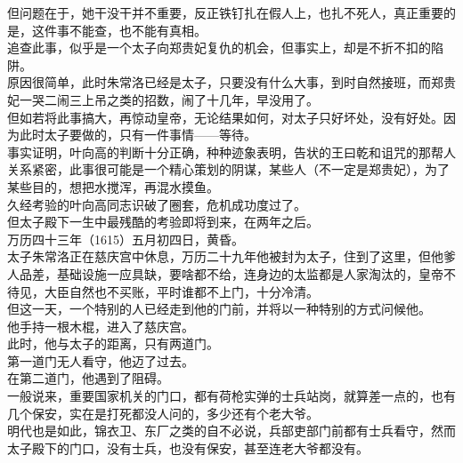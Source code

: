 \begin{multicols}{\theparacolNo}
但问题在于，她干没干并不重要，反正铁钉扎在假人上，也扎不死人，真正重要的是，这件事不能查，也不能有真相。\\

追查此事，似乎是一个太子向郑贵妃复仇的机会，但事实上，却是不折不扣的陷阱。\\

原因很简单，此时朱常洛已经是太子，只要没有什么大事，到时自然接班，而郑贵妃一哭二闹三上吊之类的招数，闹了十几年，早没用了。\\

但如若将此事搞大，再惊动皇帝，无论结果如何，对太子只好坏处，没有好处。因为此时太子要做的，只有一件事情——等待。\\

事实证明，叶向高的判断十分正确，种种迹象表明，告状的王曰乾和诅咒的那帮人关系紧密，此事很可能是一个精心策划的阴谋，某些人（不一定是郑贵妃），为了某些目的，想把水搅浑，再混水摸鱼。\\

久经考验的叶向高同志识破了圈套，危机成功度过了。\\

但太子殿下一生中最残酷的考验即将到来，在两年之后。\\

万历四十三年（1615）五月初四日，黄昏。\\

太子朱常洛正在慈庆宫中休息，万历二十九年他被封为太子，住到了这里，但他爹人品差，基础设施一应具缺，要啥都不给，连身边的太监都是人家淘汰的，皇帝不待见，大臣自然也不买账，平时谁都不上门，十分冷清。\\

但这一天，一个特别的人已经走到他的门前，并将以一种特别的方式问候他。\\

他手持一根木棍，进入了慈庆宫。\\

此时，他与太子的距离，只有两道门。\\

第一道门无人看守，他迈了过去。\\

在第二道门，他遇到了阻碍。\\

一般说来，重要国家机关的门口，都有荷枪实弹的士兵站岗，就算差一点的，也有几个保安，实在是打死都没人问的，多少还有个老大爷。\\

明代也是如此，锦衣卫、东厂之类的自不必说，兵部吏部门前都有士兵看守，然而太子殿下的门口，没有士兵，也没有保安，甚至连老大爷都没有。\\


\end{multicols}

